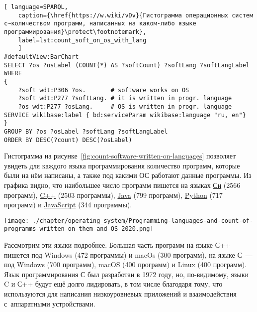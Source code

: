 % 
\begin{lstlisting}[ language=SPARQL, 
	caption={\href{https://w.wiki/vDv}{Гистограмма операционных систем с~количеством программ, написанных на каком-либо языке программирования}\protect\footnotemark},
	label=lst:count_soft_on_os_with_lang
	]
#defaultView:BarChart
SELECT ?os ?osLabel (COUNT(*) AS ?softCount) ?softLang ?softLangLabel
WHERE
{
	?soft wdt:P306 ?os.       # software works on OS
	?soft wdt:P277 ?softLang. # it is written in progr. language
	?os wdt:P277 ?osLang.     # OS is written in progr. language
SERVICE wikibase:label { bd:serviceParam wikibase:language "ru, en"}
}
GROUP BY ?os ?osLabel ?softLang ?softLangLabel
ORDER BY DESC(?count) DESC(?osLabel)
\end{lstlisting}

Гистограмма на рисунке~\ref{fig:count-software-written-on-languages} позволяет увидеть для каждого языка программирования количество программ, которые были на нём написаны, а также под какими ОС работают данные программы. Из графика видно, что наибольшее число программ пишется на языках \href{https://www.wikidata.org/wiki/Q15777}{Си} (2566 программ), \href{https://www.wikidata.org/wiki/Q2407}{C++} (2503 программы), \href{https://www.wikidata.org/wiki/Q251}{Java} (799 программ), \href{https://www.wikidata.org/wiki/Q28865}{Python} (717 программ) и \href{https://www.wikidata.org/wiki/Q2005}{JavaScript} (344 программы).

\begin{figure*}[h!]
	\texttt{[image: ./chapter/operating\_system/Programming-languages-and-count-of-programms-written-on-them-and-OS-2020.png]}
	\caption{Языки программирования и количество ОС, под которыми работают программы, написанные на этих языках, 2020 год. Ссылка на SPARQL-запрос: \href{https://w.wiki/4c7d}{https://w.wiki/4c7d}}
	\label{fig:count-software-written-on-languages}
\end{figure*}

Рассмотрим эти языки подробнее. 
Большая часть программ на языке С++ пишется под Windows (472 программы) и macOs (300 программ), 
на языке С~--- под Windows (700 программ), macOS (400 программ) и Linux (400 программ). 
Язык программирования С был разработан в 1972 году, 
но, по-видимому, языки C и С++ будут ещё долго лидировать, 
в том числе благодаря тому, что используются для написания низкоуровневых приложений 
и взаимодействия с~аппаратными устройствами\autocite{FutureProgrLang2016}.

